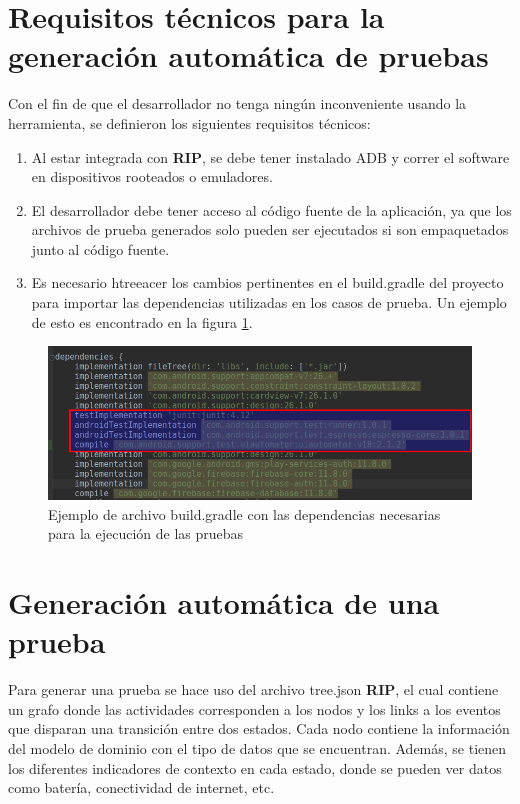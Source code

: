 \section{Requisitos técnicos para la generación automática de pruebas}
Con el fin de que el desarrollador no tenga ningún inconveniente usando la herramienta, se definieron los siguientes requisitos técnicos:
\begin{enumerate}
	\item Al estar integrada con \textbf{RIP}\cite{LinanAutomatedApps}, se debe tener instalado ADB y correr el software en dispositivos rooteados o emuladores.
	\item El desarrollador debe tener acceso al código fuente de la aplicación, ya que los archivos de prueba generados solo pueden ser ejecutados si son empaquetados junto al código fuente.
	\item Es necesario htreeacer los cambios pertinentes en el build.gradle del proyecto para importar las dependencias utilizadas en los casos de prueba. Un ejemplo de esto es encontrado en la figura \ref{dependencies}.
	

\end{enumerate} 

	\begin{figure}[h]
	\centering
	\includegraphics[width=1\textwidth]{img/dependencies.png}
	\vspace{-0.5cm}
	\caption{Ejemplo de archivo build.gradle con las dependencias necesarias para la ejecución de las pruebas}
	\label{dependencies}
\end{figure} 


\section{Generación automática de una prueba}
Para generar una prueba se hace uso del archivo tree.json \textbf{RIP}, el cual contiene un grafo donde las actividades corresponden a los nodos y los links a los eventos que disparan una transición entre dos estados. Cada nodo contiene la información del modelo de dominio con el tipo de datos que se encuentran. Además, se tienen los diferentes indicadores de contexto en cada estado, donde se pueden ver datos como batería, conectividad de internet, etc.

